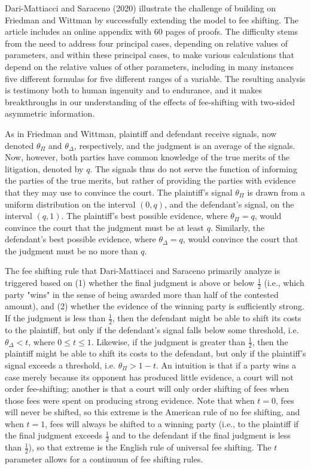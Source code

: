 \documentclass{article}
\begin{document}
Dari-Mattiacci and Saraceno (2020) illustrate the challenge of building on Friedman and Wittman by successfully extending the model to fee shifting. The article includes an online appendix with 60 pages of proofs. The difficulty stems from the need to address four principal cases, depending on relative values of parameters, and within these principal cases, to make various calculations that depend on the relative values of other parameters, including in many instances five different formulas for five different ranges of a variable. The resulting analysis is testimony both to human ingenuity and to endurance, and it makes breakthroughs in our understanding of the effects of fee-shifting with two-sided asymmetric information.

As in Friedman and Wittman, plaintiff and defendant receive signals, now denoted $\theta_\Pi$ and $\theta_\Delta$, respectively, and the judgment is an average of the signals. Now, however, both parties have common knowledge of the true merits of the litigation, denoted by $q$. The signals thus do not serve the function of informing the parties of the true merits, but rather of providing the parties with evidence that they may use to convince the court. The plaintiff's signal $\theta_\Pi$ is drawn from a uniform distribution on the interval $(0,q)$, and the defendant's signal, on the interval $(q,1)$. The plaintiff's best possible evidence, where $\theta_\Pi = q$, would convince the court that the judgment must be at least $q$. Similarly, the defendant's best possible evidence, where $\theta_\Delta = q$, would convince the court that the judgment must be no more than $q$.

The fee shifting rule that Dari-Mattiacci and Saraceno primarily analyze is triggered based on (1) whether the final judgment is above or below $\frac{1}{2}$ (i.e., which party "wins" in the sense of being awarded more than half of the contested amount), and (2) whether the evidence of the winning party is sufficiently strong. If the judgment is less than $\frac{1}{2}$, then the defendant might be able to shift its costs to the plaintiff, but only if the defendant's signal falls below some threshold, i.e. $\theta_\Delta < t$, where $0 \leq t \leq 1$. Likewise, if the judgment is greater than $\frac{1}{2}$, then the plaintiff might be able to shift its costs to the defendant, but only if the plaintiff's signal exceeds a threshold, i.e. $\theta_\Pi > 1 - t$. An intuition is that if a party wins a case merely because its opponent has produced little evidence, a court will not order fee-shifting; another is that a court will only order shifting of fees when those fees were spent on producing strong evidence. Note that when $t = 0$, fees will never be shifted, so this extreme is the American rule of no fee shifting, and when $t = 1$, fees will always be shifted to a winning party (i.e., to the plaintiff if the final judgment exceeds $\frac{1}{2}$ and to the defendant if the final judgment is less than $\frac{1}{2}$), so that extreme is the English rule of universal fee shifting. The $t$ parameter allows for a continuum of fee shifting rules.
\end{document}
